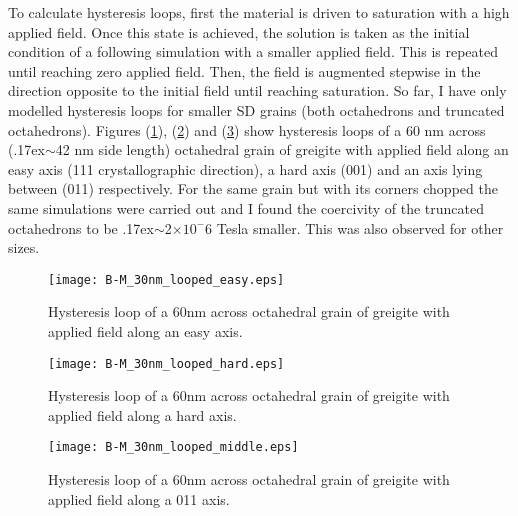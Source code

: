To calculate hysteresis loops, first the material is driven to saturation with a high applied field. Once this state is achieved, the solution is taken as the initial condition of a following simulation with a smaller applied field. This is repeated until reaching zero applied field. Then, the field is augmented stepwise in the direction opposite to the initial field until reaching saturation. So far, I have only modelled hysteresis loops for smaller SD grains (both octahedrons and truncated octahedrons). Figures (\ref{Fig10}), (\ref{Fig11}) and (\ref{Fig12}) show hysteresis loops of a 60 nm across ({\raise.17ex\hbox{$\scriptstyle\sim$}}42 nm side length) octahedral grain of greigite with applied field along an easy axis ({111} crystallographic direction), a hard axis ({001}) and an axis lying between ({011}) respectively. For the same grain but with its corners chopped the same simulations were carried out and I found the coercivity of the truncated octahedrons to be {\raise.17ex\hbox{$\scriptstyle\sim$}}2$\times10^-6$ Tesla smaller. This was also observed for other sizes.
\begin{figure}[ht]
\centering
\texttt{[image: B-M\_30nm\_looped\_easy.eps]}
\caption{Hysteresis loop of a 60nm across octahedral grain of greigite with applied field along an easy axis.}
\label{Fig10}
\end{figure}
\begin{figure}[ht]
\centering
\texttt{[image: B-M\_30nm\_looped\_hard.eps]}
\caption{Hysteresis loop of a 60nm across octahedral grain of greigite with applied field along a hard axis.}
\label{Fig11}
\end{figure}
\begin{figure}[ht]
\centering
\texttt{[image: B-M\_30nm\_looped\_middle.eps]}
\caption{Hysteresis loop of a 60nm across octahedral grain of greigite with applied field along a {011} axis.}
\label{Fig12}
\end{figure}